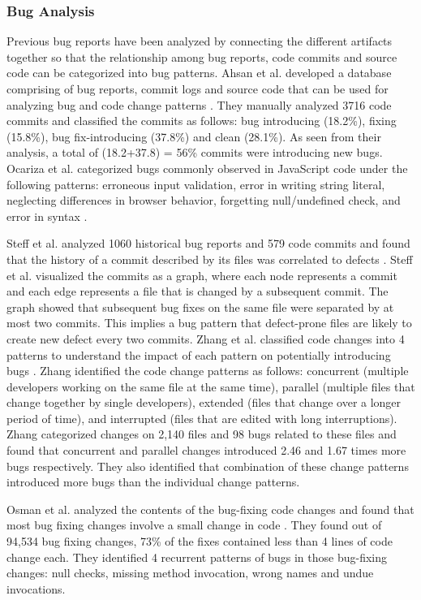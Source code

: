 \documentclass[conference]{IEEEtran}
\begin{document}
\subsubsection{Bug Analysis}
Previous bug reports have been analyzed by connecting the different artifacts together so that the relationship among bug reports, code commits and source code can be categorized into bug patterns. Ahsan et al. developed a database comprising of bug reports, commit logs and source code that can be used for analyzing bug and code change patterns \cite{database_ahsan}. They manually analyzed 3716 code commits and classified the commits as follows: bug introducing (18.2\%), fixing (15.8\%), bug fix-introducing (37.8\%) and clean (28.1\%). As seen from their analysis, a total of (18.2+37.8) = 56\%  commits were introducing new bugs. Ocariza et al. categorized bugs commonly observed in JavaScript code under the following patterns: erroneous input validation, error in writing string literal, neglecting differences in browser behavior, forgetting null/undefined check, and error in syntax \cite{Empirical_Ocariza}.

Steff et al. analyzed 1060 historical bug reports and 579 code commits and found that the history of a commit described by its files was correlated to defects \cite{co_evolution_steff}. Steff et al. visualized the commits as a graph, where each node represents a commit and each edge represents a file that is changed by a subsequent commit. The graph showed that subsequent bug fixes on the same file were separated by at most two commits. This implies a bug pattern that defect-prone files are likely to create new defect every two commits. Zhang et al. classified code changes into 4 patterns to understand the impact of each pattern on potentially introducing bugs \cite{Empirical_Zhang}. Zhang identified the code change patterns as follows: concurrent (multiple developers working on the same file at the same time), parallel (multiple files that change together by single developers), extended (files that change over a longer period of time), and interrupted (files that are edited with long interruptions). Zhang categorized changes on 2,140 files and 98 bugs related to these files and found that concurrent and parallel changes introduced 2.46 and 1.67 times more bugs respectively. They also identified that combination of these change patterns introduced more bugs than the individual change patterns.

Osman et al. analyzed the contents of the bug-fixing code changes and found that most bug fixing changes involve a small change in code \cite{mining_osman}. They found out of 94,534 bug fixing changes, 73\% of the fixes contained less than 4 lines of code change each. They identified 4 recurrent patterns of bugs in those bug-fixing changes: null checks, missing method invocation, wrong names and undue invocations.
\end{document}
